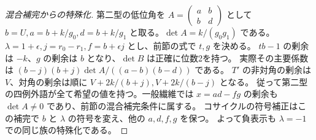 \begin{proof}[混合補完からの特殊化]
第二型の低位角を $A=\left(\begin{smallmatrix}a&b\\b&d\end{smallmatrix}\right)$ として
$b=U,a=b+k/g_0,d=b+k/g_1$ と取る。$\det A=k/(g_0g_1)$ である。
$\lambda=1+\epsilon,j=r_0-r_1,f=b+\epsilon j$ とし、前節の式で $t,g$ を決める。
$tb-1$ の剰余は $-k$、$g$ の剰余は $b$ となり、$\det B$ は正確に位数2を持つ。
実際その主要係数は $(b-j)(b+j)\det A/((a-b)(b-d))$ である。
$T'$ の非対角の剰余は $V$、対角の剰余は順に $V+2k/(b+j),V+2k/(b-j)$ となる。
従って第二型の四例外語が全て希望の値を持つ。一般繊維では
$x=ad-fg$ の剰余も $\det A\ne0$ であり、前節の混合補完条件に属する。
コサイクルの符号補正はこの補完で $b$ と $\lambda$ の符号を変え、他の $a,d,f,g$ を保つ。
よって負表示も $\lambda=-1$ での同じ族の特殊化である。
\end{proof}
